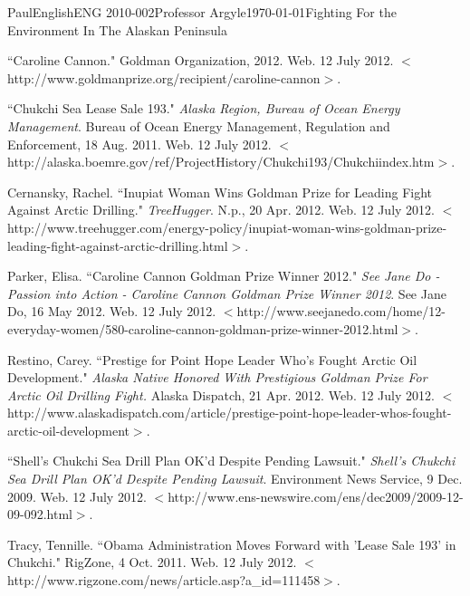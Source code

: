 \documentclass[12pt,letterpaper]{article}
\begin{document}
\begin{mla}{Paul}{English}{ENG 2010-002}{Professor Argyle}{\today}{Fighting For the Environment In The Alaskan Peninsula}
\begin{workscited}

\bibent
``Caroline Cannon." Goldman Organization, 2012. Web. 12 July 2012. $<$http://www.goldmanprize.org/recipient/caroline-cannon$>$.

\bibent
``Chukchi Sea Lease Sale 193." \textit{Alaska Region, Bureau of Ocean Energy Management}. Bureau of Ocean Energy Management, Regulation and Enforcement, 18 Aug. 2011. Web. 12 July 2012. $<$http://alaska.boemre.gov/ref/ProjectHistory/Chukchi193/Chukchiindex.htm$>$.

\bibent
Cernansky, Rachel. ``Inupiat Woman Wins Goldman Prize for Leading Fight Against Arctic Drilling." \textit{TreeHugger}. N.p., 20 Apr. 2012. Web. 12 July 2012. $<$http://www.treehugger.com/energy-policy/inupiat-woman-wins-goldman-prize-leading-fight-against-arctic-drilling.html$>$.

\bibent
Parker, Elisa. ``Caroline Cannon Goldman Prize Winner 2012." \textit{See Jane Do - Passion into Action - Caroline Cannon Goldman Prize Winner 2012}. See Jane Do, 16 May 2012. Web. 12 July 2012. $<$http://www.seejanedo.com/home/12-everyday-women/580-caroline-cannon-goldman-prize-winner-2012.html$>$.

\bibent 
Restino, Carey. ``Prestige for Point Hope Leader Who's Fought Arctic Oil Development." \textit{Alaska Native Honored With Prestigious Goldman Prize For Arctic Oil Drilling Fight.} Alaska Dispatch, 21 Apr. 2012. Web. 12 July 2012. $<$http://www.alaskadispatch.com/article/prestige-point-hope-leader-whos-fought-arctic-oil-development$>$.

\bibent
``Shell's Chukchi Sea Drill Plan OK'd Despite Pending Lawsuit." \textit{Shell's Chukchi Sea Drill Plan OK'd Despite Pending Lawsuit}. Environment News Service, 9 Dec. 2009. Web. 12 July 2012. $<$http://www.ens-newswire.com/ens/dec2009/2009-12-09-092.html$>$.

\bibent
Tracy, Tennille. ``Obama Administration Moves Forward with 'Lease Sale 193' in Chukchi." RigZone, 4 Oct. 2011. Web. 12 July 2012. $<$http://www.rigzone.com/news/article.asp?a\_id=111458$>$.

\end{workscited}
\end{mla}
\end{document}
